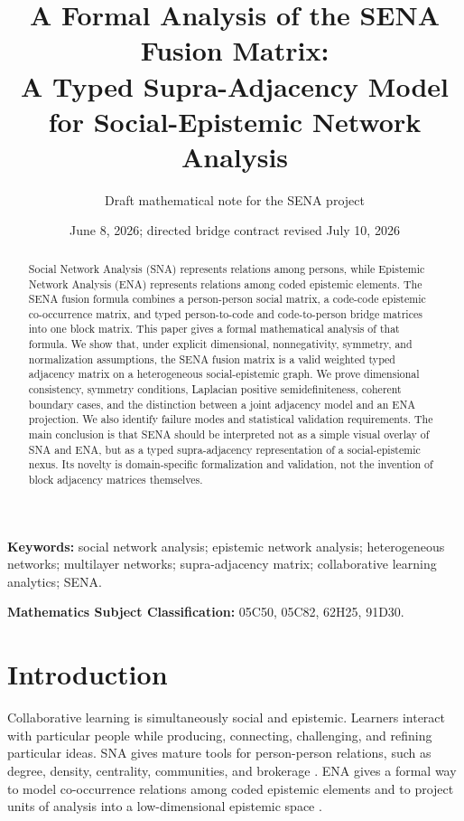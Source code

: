 \documentclass[11pt]{article}
\title{A Formal Analysis of the SENA Fusion Matrix:\\
A Typed Supra-Adjacency Model for Social-Epistemic Network Analysis}
\author{Draft mathematical note for the SENA project}
\date{June 8, 2026; directed bridge contract revised July 10, 2026}
\theoremstyle{definition}
\begin{document}
\maketitle

\begin{abstract}
Social Network Analysis (SNA) represents relations among persons, while
Epistemic Network Analysis (ENA) represents relations among coded epistemic
elements. The SENA fusion formula combines a person-person social matrix, a
code-code epistemic co-occurrence matrix, and typed person-to-code and
code-to-person bridge matrices into one block matrix. This paper gives a formal mathematical analysis
of that formula. We show that, under explicit dimensional, nonnegativity,
symmetry, and normalization assumptions, the SENA fusion matrix is a valid
weighted typed adjacency matrix on a heterogeneous social-epistemic graph. We
prove dimensional consistency, symmetry conditions, Laplacian positive
semidefiniteness, coherent boundary cases, and the distinction between a joint
adjacency model and an ENA projection. We also identify failure modes and
statistical validation requirements. The main conclusion is that SENA should be
interpreted not as a simple visual overlay of SNA and ENA, but as a typed
supra-adjacency representation of a social-epistemic nexus. Its novelty is
domain-specific formalization and validation, not the invention of block
adjacency matrices themselves.
\end{abstract}

\noindent\textbf{Keywords:} social network analysis; epistemic network
analysis; heterogeneous networks; multilayer networks; supra-adjacency matrix;
collaborative learning analytics; SENA.

\noindent\textbf{Mathematics Subject Classification:} 05C50, 05C82, 62H25,
91D30.

\section{Introduction}

Collaborative learning is simultaneously social and epistemic. Learners
interact with particular people while producing, connecting, challenging, and
refining particular ideas. SNA gives mature tools for person-person relations,
such as degree, density, centrality, communities, and brokerage
\cite{wasserman1994}. ENA gives a
formal way to model co-occurrence relations among coded epistemic elements and
to project units of analysis into a low-dimensional epistemic space
\cite{shaffer2016,bowman2021}.
\end{document}
